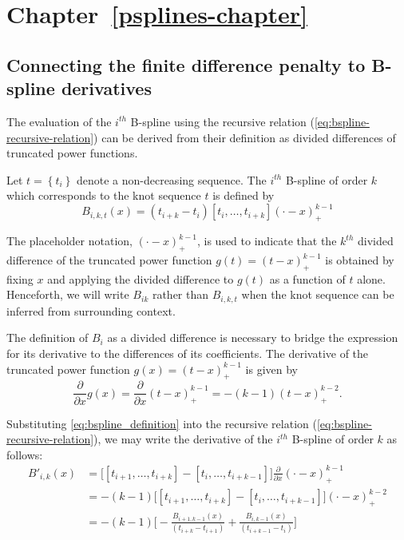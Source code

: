 \chapter{Chapter~\ref{psplines-chapter}} \label{psplines-appendix}

\section{Connecting the finite difference penalty to B-spline derivatives}

The evaluation of the $i^{th}$ B-spline using the recursive relation (\ref{eq:bspline-recursive-relation}) can be derived from their definition as divided differences of truncated power functions.  

\begin{definition} \label{definition:order_k_Bspline}
Let $t= \left\{ t_i \right\}$ denote a non-decreasing sequence. The $i^{th}$ B-spline of order $k$ which corresponds to the knot sequence $t$ is defined by 
\begin{equation} \label{eq:bspline_definition}
B_{i,k,t}\left(x\right) = \left(t_{i+k}-t_i\right)\left[t_i,\dots,t_{i+k}\right]\left(\cdot -x\right)_+^{k-1}
\end{equation}
\end{definition}

The placeholder notation, $\left(\cdot - x\right)_+^{k-1}$, is used to indicate that the $k^{th}$ divided difference of the truncated power function $g\left(t \right) = \left(t-x\right)^{k-1}_+$ is obtained by fixing $x$ and applying the divided difference to $g\left(t \right)$ as a function of $t$ alone. Henceforth, we will write $B_{ik}$ rather than $B_{i,k,t}$ when the knot sequence can be inferred from surrounding context.

\bigskip

The definition of $B_i$ as a divided difference is necessary to bridge the expression for its derivative to the differences of its coefficients. The derivative of the truncated power function $g\left(x\right) = \left(t-x\right)_+^{k-1}$ is given by 
\[
\frac{\partial}{\partial x}g\left(x\right) = \frac{\partial}{\partial x} \left(t-x\right)_+^{k-1} = -\left(k-1\right)\left(t-x\right)_+^{k-2}.
\]

\noindent
Substituting \ref{eq:bspline_definition} into the recursive relation (\ref{eq:bspline-recursive-relation}), we may write the derivative of the $i^{th}$ B-spline of order $k$ as follows:
\begin{align*}
 B'_{i,k}\left(x\right) &= \bigg[ \left[ t_{i+1},\dots,t_{i+k} \right] -\left[ t_{i},\dots,t_{i+k-1} \right] \bigg] \frac{\partial}{\partial x} \left(\cdot - x\right)_+^{k-1}\\
&= -\left(k-1\right) \bigg[ \left[ t_{i+1},\dots,t_{i+k} \right] -\left[ t_{i},\dots,t_{i+k-1} \right] \bigg] \left( \cdot - x \right)^{k-2}_+ \\
&= -\left(k-1\right) \bigg[ -\frac{B_{i+1,k-1}\left(x\right)}{\left(t_{i+k} - t_{i+1} \right)}  + \frac{B_{i,k-1}\left(x\right)}{\left(t_{i+k-1} - t_{i} \right)} \bigg]  
\end{align*}

